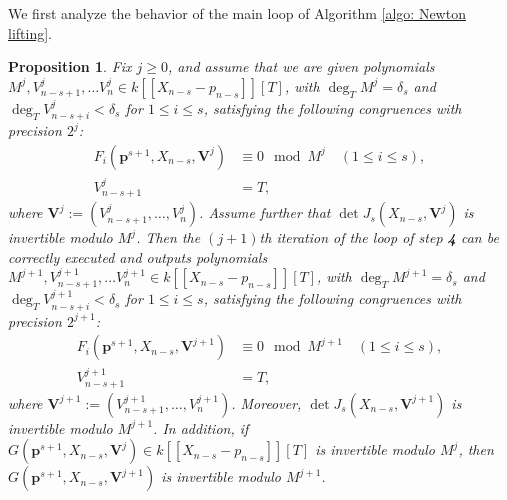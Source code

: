 \documentclass[pdflatex,sn-basic]{sn-jnl}%
\theoremstyle{thmstyleone}%
\newtheorem{proposition}[theorem]{Proposition}%
\theoremstyle{thmstyletwo}%
\theoremstyle{thmstylethree}%
\theoremstyle{definition}
\numberwithin{equation}{section}
\newcommand{\bfs}{\boldsymbol}
\begin{document}
We first analyze the behavior of the main loop of Algorithm
\ref{algo: Newton lifting}.
%
\begin{proposition}\label{prop: main loop Newton lifting}
Fix $j\ge 0$, and assume that we are given polynomials $M^j,V_{n-s+1}^j, \ldots V_n^j\in
k[\![X_{n-s} -p_{n-s}]\!][T]$, with $\deg_TM^j=\delta_s$ and $\deg_T
V_{n-s+i}^j<\delta_s$ for $1\le i\le s$, satisfying the following
congruences with precision $2^j$:
%
\begin{align}
F_i (\bfs p^{s+1}, X_{n-s}, \bfs V^j) & \equiv 0  \mod M^j\quad (1 \le i
\le s),
\label{eq: CongruenceProofHL1}\\
V_{n-s+1}^j& = T, \label{eq: CongruenceProofHL2}
\end{align}
%
where $\bfs V^j:=(V_{n-s+1}^j, \ldots, V_n^j)$. Assume further that
$\det J_s(X_{n-s}, \bfs V^j)$ is invertible modulo $M^j$. Then the
$(j+1)$th iteration of the loop of step {\bf 4} can be correctly
executed and outputs polynomials $M^{j+1},V_{n-s+1}^{j+1}, \ldots
V_n^{j+1} \in k[\![X_{n-s} -p_{n-s}]\!][T]$, with
$\deg_TM^{j+1}=\delta_s$ and $\deg_T V_{n-s+i}^{j+1}<\delta_s$ for
$1\le i\le s$, satisfying the following congruences with precision
$2^{j+1}$:
%
\begin{align*}
F_i (\bfs p^{s+1}, X_{n-s},\bfs V^{j+1})  & \equiv 0  \mod M^{j+1} \quad
(1 \le i \le s),
\\
V_{n-s+1}^{j+1}& = T,
\end{align*}
%
where $\bfs V^{j+1}\!:=(V_{n-s+1}^{j+1}, \ldots, V_n^{j+1})$.
Moreover, $\det J_s(X_{n-s},\bfs V^{j+1} )$ is invertible modulo
$M^{j+1}$. In addition, if $G(\bfs p^{s+1}, X_{n-s}, \bfs V^j)\in
k[\![X_{n-s} -p_{n-s}]\!][T]$ is invertible modulo $M^j$, then
$G(\bfs p^{s+1}, X_{n-s}, \bfs V^{j+1})$ is invertible modulo
$M^{j+1}$.
\end{proposition}
%
\end{document}
